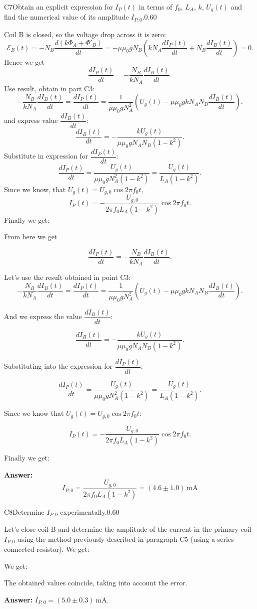 \documentclass[11pt,a4paper]{article}
\begin{document}
\begin{solcard}{C7}{Obtain an explicit expression for $I_P(t)$ in terms of $f_0$, $L_A$, $k$, $U_g(t)$ and find the numerical value of its amplitude $I_{P,0}$.}{0.60}

Coil B is closed, so the voltage drop across it is zero: $$\mathcal{E}_B(t)=-N_B\dfrac{d(k\Phi_A+\Phi'_B)}{dt}=-\mu\mu_0gN_B\left(kN_A\dfrac{dI_P(t)}{dt}+N_B\dfrac{dI_B(t)}{dt}\right)=0.$$ Hence we get $$\dfrac{dI_P(t)}{dt}=-\dfrac{N_B}{kN_A}\dfrac{dI_B(t)}{dt}.$$ Use result, obtain in part C3: $$-\dfrac{N_B}{kN_A}\dfrac{dI_B(t)}{dt}=\dfrac{dI_P(t)}{dt}=\dfrac{1}{\mu\mu_0gN^2_A}\left(U_g(t)-\mu\mu_0gkN_AN_B\dfrac{dI_B(t)}{dt}\right).$$ and express value $\dfrac{dI_B(t)}{dt}$: $$\dfrac{dI_B(t)}{dt}=-\dfrac{kU_g(t)}{\mu\mu_0gN_AN_B(1-k^2)}.$$ Substitute in expression for $\dfrac{dI_P (t)}{dt}$: $$\dfrac{dI_P(t)}{dt}=\dfrac{U_g(t)}{\mu\mu_0gN^2_A(1-k^2)}=\dfrac{U_g(t)}{L_A(1-k^2)}.$$ Since we know, that $U_g(t)=U_{g,0}\cos{2\pi{}f_0t}$, $$I_P(t)=-\dfrac{U_{g,0}}{2\pi{}f_0L_A(1-k^2)}\cos 2\pi{}f_0t.$$ Finally we get:


From here we get


$$\dfrac{dI_P(t)}{dt}=-\dfrac{N_B}{kN_A}\dfrac{dI_B(t)}{dt}.$$


Let's use the result obtained in point C3: $$-\dfrac{N_B}{kN_A}\dfrac{dI_B(t)}{dt}=\dfrac{dI_P(t)}{dt}=\dfrac{1}{\mu\mu_0gN^2_A}\left(U_g(t)-\mu\mu_0gkN_AN_B\dfrac{dI_B(t)}{dt}\right).$$


And we express the value $\dfrac{dI_B(t)}{dt}$:


$$\dfrac{dI_B(t)}{dt}=-\dfrac{kU_g(t)}{\mu\mu_0gN_AN_B(1-k^2)}.$$


Substituting into the expression for $\dfrac{dI_P(t)}{dt}$:


$$\dfrac{dI_P(t)}{dt}=\dfrac{U_g(t)}{\mu\mu_0gN^2_A(1-k^2)}=\dfrac{U_g(t)}{L_A(1-k^2)}.$$


Since we know that $U_g(t)=U_{g,0}\cos{2\pi{}f_0t}:$


$$I_P(t)=-\dfrac{U_{g,0}}{2\pi{}f_0L_A(1-k^2)}\cos2\pi{}f_0t.$$


Finally we get:

\par\smallskip\noindent\textbf{Answer:} $$I_{P,0}=\dfrac{U_{g,0}}{2\pi{}f_0L_A(1-k^2)}=(4.6\pm1.0)~\mathrm{mA}$$
\end{solcard}

\begin{solcard}{C8}{Determine $I_{P,0}$ experimentally.}{0.60}

Let's close coil B and determine the amplitude of the current in the primary coil $I_{P,0}$ using the method previously described in paragraph C5 (using a series-connected resistor). We get:


We get:


The obtained values coincide, taking into account the error.

\par\smallskip\noindent\textbf{Answer:} $I_{P,0}=(5.0\pm0.3)~\mathrm{mA}.$
\end{solcard}
\end{document}
